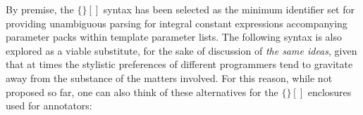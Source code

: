{}

\p By premise, the $\bm{\{\}[]}$ syntax has been selected as the minimum identifier set for providing unambiguous parsing for integral constant expressions accompanying parameter packs within template parameter lists.
The following syntax is also explored as a viable substitute, for the sake of discussion of \textit{the same ideas}, given that at times the stylistic preferences of different programmers tend to gravitate away from the substance of the matters involved.
For this reason, while not proposed so far, one can also think of these alternatives for the $\bm{\{\}[]}$ enclosures used for annotators:
